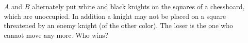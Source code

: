 $A$ and $B$ alternately put white and black knights on the squares of a chessboard, which are unoccupied. In addition a knight may not be placed on a square threatened by an enemy knight (of the other color). The loser is the one who cannot move any more. Who wins?
